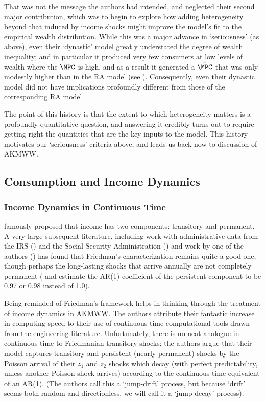 \documentclass[titlepage]{econtex}
\begin{document}
That was not the message the authors had intended, and neglected their second major contribution, which was to begin to explore how adding heterogeneity beyond that induced by income shocks might improve the model's fit to the empirical wealth distribution.  While this was a major advance in `seriousness' (as above), even their `dynastic' model greatly understated the degree of wealth inequality; and in particular it produced very few consumers at low levels of wealth where the $\MPC$ is high, and as a result it generated a $\bar{\MPC}$ that was only modestly higher than in the RA model (see \cite{cstwMPC}).  Consequently, even their dynastic model did not have implications profoundly different from those of the corresponding RA model.

The point of this history is that the extent to which heterogeneity matters is a profoundly quantitative question, and answering it credibly turns out to require getting right the quantities that are the key inputs to the model.  This history motivates our `seriousness' criteria above, and leads us back now to discussion of AKMWW.

\subsection{Consumption and Income Dynamics}

\subsubsection{Income Dynamics in Continuous Time}

\cite{friedmanATheory} famously proposed that income has two components: transitory and permanent. A very large subsequent literature, including work with administrative data from the IRS (\cite{dhprvInequality}) and the Social Security Administration (\cite{SabelhausSong}) and work by one of the authors (\cite{kaplanInequality}) has found that Friedman's characterization remains quite a good one, though perhaps the long-lasting shocks that arrive annually are not completely permanent (\cite{dhprvInequality} and \cite{kaplanInequality} estimate the AR(1) coefficient of the persistent component to be 0.97 or 0.98 instead of 1.0).


Being reminded of Friedman's framework helps in thinking through the treatment of income dynamics in AKMWW.  The authors attribute their fantastic increase in computing speed to their use of continuous-time computational tools drawn from the engineering literature.  Unfortunately, there is no neat analogue in continuous time to Friedmanian transitory shocks; the authors argue that their model captures transitory and persistent (nearly permanent) shocks by the Poisson arrival of their $z_1$ and $z_2$ shocks which decay (with perfect predictability, unless another Poisson shock arrives) according to the continuous-time equivalent of an AR(1).  (The authors call this a `jump-drift' process, but because `drift' seems both random and directionless, we will call it a `jump-decay' process).
\end{document}

